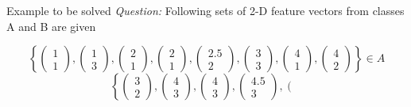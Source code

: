 \begin{frame}{Example to be solved}
\textit{Question:} Following sets of 2-D feature vectors from classes A and B are given
\begin{footnotesize}
\begin{equation}
\left\{ {\left( {\begin{array}{*{20}{c}}
1\\
1
\end{array}} \right),\left( {\begin{array}{*{20}{c}}
1\\
3
\end{array}} \right),\left( {\begin{array}{*{20}{c}}
2\\
1
\end{array}} \right),\left( {\begin{array}{*{20}{c}}
2\\
1
\end{array}} \right),\left( {\begin{array}{*{20}{c}}
{2.5}\\
2
\end{array}} \right),\left( {\begin{array}{*{20}{c}}
3\\
3
\end{array}} \right),\left( {\begin{array}{*{20}{c}}
4\\
1
\end{array}} \right),\left( {\begin{array}{*{20}{c}}
4\\
2
\end{array}} \right)} \right\} \in A \nonumber
\end{equation}
\begin{equation}
\left\{ {\left( {\begin{array}{*{20}{c}}
3\\
2
\end{array}} \right),\left( {\begin{array}{*{20}{c}}
4\\
3
\end{array}} \right),\left( {\begin{array}{*{20}{c}}
4\\
3
\end{array}} \right),\left( {\begin{array}{*{20}{c}}
4.5\\
3
\end{array}} \right),\left( {\begin{array}{*{20}{c}}

\end{array}}}
\end{equation}
\end{footnotesize}
\end{frame}
